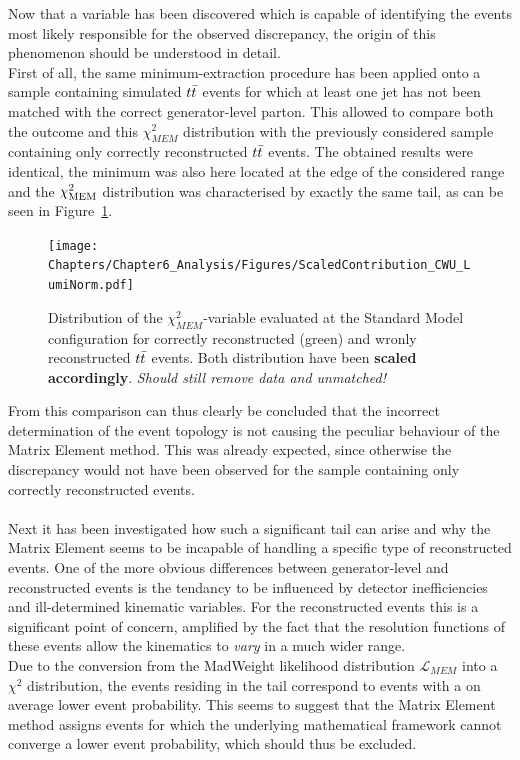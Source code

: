Now that a variable has been discovered which is capable of identifying the events most likely responsible for the observed discrepancy, the origin of this phenomenon should be understood in detail.
\\
First of all, the same minimum-extraction procedure has been applied onto a sample containing simulated $t\bar{t}$ events for which at least one jet has not been matched with the correct generator-level parton.
This allowed to compare both the outcome and this $\chi^{2}_{MEM}$ distribution with the previously considered sample containing only correctly reconstructed $t\bar{t}$ events.
The obtained results were identical, the minimum was also here located at the edge of the considered range and the $\chi^{2}_{\textrm{MEM}}$ distribution was characterised by exactly the same tail, as can be seen in Figure~\ref{fig::SMLikCorrVSWr}.
\\
\begin{figure}[h!t]
 \centering
 \texttt{[image: Chapters/Chapter6\_Analysis/Figures/ScaledContribution\_CWU\_LumiNorm.pdf]}
 \caption{Distribution of the $\chi^{2}_{MEM}$-variable evaluated at the Standard Model configuration for correctly reconstructed (green) and wronly reconstructed $t\bar{t}$ events. Both distribution have been \textbf{scaled accordingly}. \textit{Should still remove data and unmatched!}} \label{fig::SMLikCorrVSWr}
\end{figure}
From this comparison can thus clearly be concluded that the incorrect determination of the event topology is not causing the peculiar behaviour of the Matrix Element method.
This was already expected, since otherwise the discrepancy would not have been observed for the sample containing only correctly reconstructed events.
\\
\\
Next it has been investigated how such a significant tail can arise and why the Matrix Element seems to be incapable of handling a specific type of reconstructed events.
One of the more obvious differences between generator-level and reconstructed events is the tendancy to be influenced by detector inefficiencies and ill-determined kinematic variables. For the reconstructed events this is a significant point of concern, amplified by the fact that the resolution functions of these events allow the kinematics to \textit{vary} in a much wider range.
\\
Due to the conversion from the MadWeight likelihood distribution $\mathcal{L}_{MEM}$ into a $\chi^{2}$ distribution, the events residing in the tail correspond to events with a on average lower event probability.
This seems to suggest that the Matrix Element method assigns events for which the underlying mathematical framework cannot converge a lower event probability, which should thus be excluded.

